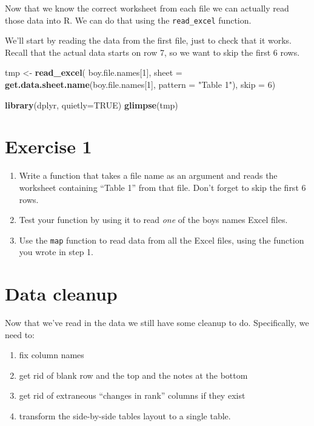 \documentclass[]{book}
\newenvironment{Shaded}{\begin{snugshade}}{\end{snugshade}}
\newcommand{\KeywordTok}[1]{\textcolor[rgb]{0.13,0.29,0.53}{\textbf{#1}}}
\newcommand{\DataTypeTok}[1]{\textcolor[rgb]{0.13,0.29,0.53}{#1}}
\newcommand{\DecValTok}[1]{\textcolor[rgb]{0.00,0.00,0.81}{#1}}
\newcommand{\StringTok}[1]{\textcolor[rgb]{0.31,0.60,0.02}{#1}}
\newcommand{\OtherTok}[1]{\textcolor[rgb]{0.56,0.35,0.01}{#1}}
\newcommand{\NormalTok}[1]{#1}
\providecommand{\tightlist}{%
  \setlength{\itemsep}{0pt}\setlength{\parskip}{0pt}}
\begin{document}
Now that we know the correct worksheet from each file we can actually
read those data into R. We can do that using the \texttt{read\_excel}
function.

We'll start by reading the data from the first file, just to check that
it works. Recall that the actual data starts on row 7, so we want to
skip the first 6 rows.

\begin{Shaded}
\begin{Highlighting}[]
\NormalTok{tmp <-}\StringTok{ }\KeywordTok{read_excel}\NormalTok{(}
\NormalTok{    boy.file.names[}\DecValTok{1}\NormalTok{],}
    \DataTypeTok{sheet =} \KeywordTok{get.data.sheet.name}\NormalTok{(boy.file.names[}\DecValTok{1}\NormalTok{],}
                                \DataTypeTok{pattern =} \StringTok{"Table 1"}\NormalTok{),}
    \DataTypeTok{skip =} \DecValTok{6}\NormalTok{)}

\KeywordTok{library}\NormalTok{(dplyr, }\DataTypeTok{quietly=}\OtherTok{TRUE}\NormalTok{)}
\KeywordTok{glimpse}\NormalTok{(tmp)}
\end{Highlighting}
\end{Shaded}

\section{Exercise 1}\label{exercise-1-3}

\begin{enumerate}
\def\labelenumi{\arabic{enumi}.}
\item
  Write a function that takes a file name as an argument and reads the
  worksheet containing ``Table 1'' from that file. Don't forget to skip
  the first 6 rows.
\item
  Test your function by using it to read \emph{one} of the boys names
  Excel files.
\item
  Use the \texttt{map} function to read data from all the Excel files,
  using the function you wrote in step 1.
\end{enumerate}

\section{Data cleanup}\label{data-cleanup}

Now that we've read in the data we still have some cleanup to do.
Specifically, we need to:

\begin{enumerate}
\def\labelenumi{\arabic{enumi}.}
\tightlist
\item
  fix column names
\item
  get rid of blank row and the top and the notes at the bottom
\item
  get rid of extraneous ``changes in rank'' columns if they exist
\item
  transform the side-by-side tables layout to a single table.
\end{enumerate}
\end{document}
